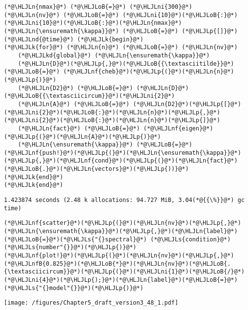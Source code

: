 \documentclass[12pt,landscape]{article}
\newcommand{\HLJLk}[1]{\textcolor[RGB]{148,91,176}{\textbf{#1}}}
\newcommand{\HLJLkd}[1]{\textcolor[RGB]{214,102,97}{\textit{#1}}}
\newcommand{\HLJLn}[1]{#1}
\newcommand{\HLJLnd}[1]{\textcolor[RGB]{214,102,97}{#1}}
\newcommand{\HLJLnf}[1]{\textcolor[RGB]{66,102,213}{#1}}
\newcommand{\HLJLs}[1]{\textcolor[RGB]{201,61,57}{#1}}
\newcommand{\HLJLnfB}[1]{\textcolor[RGB]{59,151,46}{#1}}
\newcommand{\HLJLni}[1]{\textcolor[RGB]{59,151,46}{#1}}
\newcommand{\HLJLoB}[1]{\textcolor[RGB]{102,102,102}{\textbf{#1}}}
\newcommand{\HLJLp}[1]{#1}
\begin{document}
{\begin{lstlisting}
(*@\HLJLn{nmax}@*) (*@\HLJLoB{=}@*) (*@\HLJLni{300}@*)
(*@\HLJLn{nv}@*) (*@\HLJLoB{=}@*) (*@\HLJLni{10}@*)(*@\HLJLoB{:}@*)(*@\HLJLni{10}@*)(*@\HLJLoB{:}@*)(*@\HLJLn{nmax}@*)
(*@\HLJLn{\ensuremath{\kappa}}@*) (*@\HLJLoB{=}@*) (*@\HLJLp{[]}@*)
(*@\HLJLnd{@time}@*) (*@\HLJLk{begin}@*)
(*@\HLJLk{for}@*) (*@\HLJLn{n}@*) (*@\HLJLoB{=}@*) (*@\HLJLn{nv}@*)
    (*@\HLJLkd{global}@*) (*@\HLJLn{\ensuremath{\kappa}}@*)
    (*@\HLJLn{D}@*)(*@\HLJLp{,}@*)(*@\HLJLoB{{\textasciitilde}}@*) (*@\HLJLoB{=}@*) (*@\HLJLnf{cheb}@*)(*@\HLJLp{(}@*)(*@\HLJLn{n}@*)(*@\HLJLp{)}@*)
    (*@\HLJLn{D2}@*) (*@\HLJLoB{=}@*) (*@\HLJLn{D}@*)(*@\HLJLoB{{\textasciicircum}}@*)(*@\HLJLni{2}@*)
    (*@\HLJLn{A}@*) (*@\HLJLoB{=}@*) (*@\HLJLn{D2}@*)(*@\HLJLp{[}@*)(*@\HLJLni{2}@*)(*@\HLJLoB{:}@*)(*@\HLJLn{n}@*)(*@\HLJLp{,}@*)(*@\HLJLni{2}@*)(*@\HLJLoB{:}@*)(*@\HLJLn{n}@*)(*@\HLJLp{]}@*)
    (*@\HLJLn{fact}@*) (*@\HLJLoB{=}@*) (*@\HLJLnf{eigen}@*)(*@\HLJLp{(}@*)(*@\HLJLn{A}@*)(*@\HLJLp{)}@*)
    (*@\HLJLn{\ensuremath{\kappa}}@*) (*@\HLJLoB{=}@*) (*@\HLJLnf{push!}@*)(*@\HLJLp{(}@*)(*@\HLJLn{\ensuremath{\kappa}}@*)(*@\HLJLp{,}@*)(*@\HLJLnf{cond}@*)(*@\HLJLp{(}@*)(*@\HLJLn{fact}@*)(*@\HLJLoB{.}@*)(*@\HLJLn{vectors}@*)(*@\HLJLp{))}@*)
(*@\HLJLk{end}@*)
(*@\HLJLk{end}@*)
\end{lstlisting}

\begin{lstlisting}
1.423874 seconds (2.48 k allocations: 94.727 MiB, 3.04(*@{{\%}}@*) gc time)
\end{lstlisting}


\begin{lstlisting}
(*@\HLJLnf{scatter}@*)(*@\HLJLp{(}@*)(*@\HLJLn{nv}@*)(*@\HLJLp{,}@*)(*@\HLJLn{\ensuremath{\kappa}}@*)(*@\HLJLp{,}@*)(*@\HLJLn{label}@*)(*@\HLJLoB{=}@*)(*@\HLJLs{"{}spectral}@*) (*@\HLJLs{condition}@*) (*@\HLJLs{number"{}}@*)(*@\HLJLp{)}@*)
(*@\HLJLnf{plot!}@*)(*@\HLJLp{(}@*)(*@\HLJLn{nv}@*)(*@\HLJLp{,}@*)(*@\HLJLnfB{0.825}@*)(*@\HLJLoB{*}@*)(*@\HLJLn{nv}@*)(*@\HLJLoB{.{\textasciicircum}}@*)(*@\HLJLp{(}@*)(*@\HLJLni{1}@*)(*@\HLJLoB{/}@*)(*@\HLJLni{4}@*)(*@\HLJLp{);}@*)(*@\HLJLn{label}@*)(*@\HLJLoB{=}@*)(*@\HLJLs{"{}model"{}}@*)(*@\HLJLp{)}@*)
\end{lstlisting}

\texttt{[image: /figures/Chapter5\_draft\_version3\_48\_1.pdf]}

}
\end{document}
